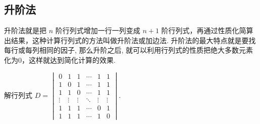 
\subsection{升阶法}

升阶法就是把 $n$ 阶行列式增加一行一列变成 $n+1$ 阶行列式，再通过性质化简算出结果，这种计算行列式的方法叫做升阶法或加边法. 升阶法的最大特点就是要找每行或每列相同的因子, 那么升阶之后, 就可以利用行列式的性质把绝大多数元素化为0，这样就达到简化计算的效果.

\begin{example}{}{}
    解行列式 $D=\begin{vmatrix}
            0      & 1      & 1      & \cdots & 1      & 1      \\
            1      & 0      & 1      & \cdots & 1      & 1      \\
            1      & 1      & 0      & \cdots & 1      & 1      \\
            \vdots & \vdots & \vdots & \ddots & \vdots & \vdots \\
            1      & 1      & 1      & \cdots & 0      & 1      \\
            1      & 1      & 1      & \cdots & 1      & 0
        \end{vmatrix}$.
\end{example}

